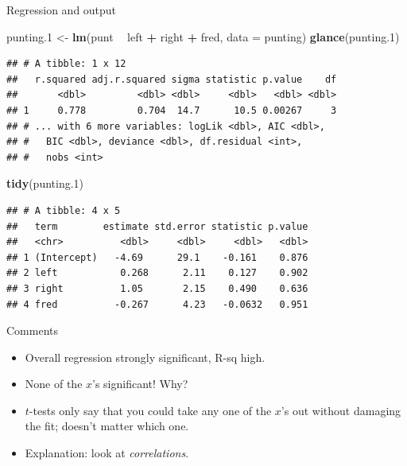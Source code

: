 \documentclass[
  ignorenonframetext,
]{beamer}
\newenvironment{Shaded}{\begin{snugshade}}{\end{snugshade}}
\newcommand{\DataTypeTok}[1]{\textcolor[rgb]{0.13,0.29,0.53}{#1}}
\newcommand{\FloatTok}[1]{\textcolor[rgb]{0.00,0.00,0.81}{#1}}
\newcommand{\KeywordTok}[1]{\textcolor[rgb]{0.13,0.29,0.53}{\textbf{#1}}}
\newcommand{\NormalTok}[1]{#1}
\newcommand{\OperatorTok}[1]{\textcolor[rgb]{0.81,0.36,0.00}{\textbf{#1}}}
\newcommand{\StringTok}[1]{\textcolor[rgb]{0.31,0.60,0.02}{#1}}
\begin{document}
\begin{frame}[fragile]{Regression and output}
\protect\hypertarget{regression-and-output}{}

\small

\begin{Shaded}
\begin{Highlighting}[]
\NormalTok{punting}\FloatTok{.1}\NormalTok{ <-}\StringTok{ }\KeywordTok{lm}\NormalTok{(punt }\OperatorTok{~}\StringTok{ }\NormalTok{left }\OperatorTok{+}\StringTok{ }\NormalTok{right }\OperatorTok{+}\StringTok{ }\NormalTok{fred, }\DataTypeTok{data =}\NormalTok{ punting)}
\KeywordTok{glance}\NormalTok{(punting}\FloatTok{.1}\NormalTok{)}
\end{Highlighting}
\end{Shaded}

\begin{verbatim}
## # A tibble: 1 x 12
##   r.squared adj.r.squared sigma statistic p.value    df
##       <dbl>         <dbl> <dbl>     <dbl>   <dbl> <dbl>
## 1     0.778         0.704  14.7      10.5 0.00267     3
## # ... with 6 more variables: logLik <dbl>, AIC <dbl>,
## #   BIC <dbl>, deviance <dbl>, df.residual <int>,
## #   nobs <int>
\end{verbatim}

\begin{Shaded}
\begin{Highlighting}[]
\KeywordTok{tidy}\NormalTok{(punting}\FloatTok{.1}\NormalTok{)}
\end{Highlighting}
\end{Shaded}

\begin{verbatim}
## # A tibble: 4 x 5
##   term        estimate std.error statistic p.value
##   <chr>          <dbl>     <dbl>     <dbl>   <dbl>
## 1 (Intercept)   -4.69      29.1    -0.161    0.876
## 2 left           0.268      2.11    0.127    0.902
## 3 right          1.05       2.15    0.490    0.636
## 4 fred          -0.267      4.23   -0.0632   0.951
\end{verbatim}

\normalsize

\end{frame}

\begin{frame}{Comments}
\protect\hypertarget{comments-8}{}

\begin{itemize}
\item
  Overall regression strongly significant, R-sq high.
\item
  None of the \(x\)'s significant! Why?
\item
  \(t\)-tests only say that you could take any one of the \(x\)'s out
  without damaging the fit; doesn't matter which one.
\item
  Explanation: look at \emph{correlations}.
\end{itemize}

\end{frame}
\end{document}
